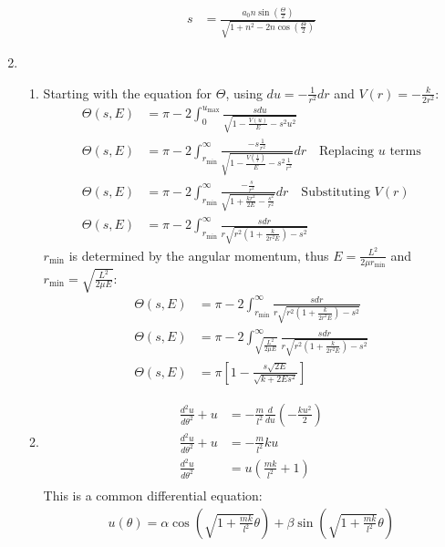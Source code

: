 \documentclass[12pt]{article}
\newcommand{\der}[2]{\frac{d #1}{d #2}}
\begin{document}
\begin{enumerate}
\begin{enumerate}
\begin{align*}
        s&=\frac{a_0 n\sin\left( \frac{\Theta}{2} \right)}{\sqrt{1+n^2-2n\cos\left( \frac{\Theta}{2} \right)}}
      \end{align*}
    \end{enumerate}
    \item
    \begin{enumerate}
      \item Starting with the equation for $\Theta$, using $du=-\frac{1}{r^2}dr$ and $V(r)=-\frac{k}{2r^2}$:
      \begin{align*}
        \Theta(s,E)&=\pi-2\int_0^{u_{\max}}\frac{sdu}{\sqrt{1-\frac{V(u)}{E}-s^2 u^2}}\\
        \Theta(s,E)&=\pi-2\int_{r_{\min}}^{\infty}\frac{-s\frac{1}{r^2}}{\sqrt{1-\frac{V(\frac{1}{r})}{E}-s^2\frac{1}{r^2}}}dr\quad\text{Replacing $u$ terms}\\
        \Theta(s,E)&=\pi-2\int_{r_{\min}}^{\infty}\frac{-\frac{s}{r^2}}{\sqrt{1+\frac{kr^2}{2E}-\frac{s^2}{r^2}}}dr\quad\text{Substituting $V(r)$}\\
        \Theta(s,E)&=\pi-2\int_{r_{\min}}^{\infty}\frac{sdr}{r\sqrt{r^2\left(1+\frac{k}{2r^2 E}\right)-s^2}}
      \end{align*}
      $r_{\min}$ is determined by the angular momentum, thus $E=\frac{L^2}{2\mu r_{\min}}$ and $r_{\min}=\sqrt{\frac{L^2}{2\mu E}}$:
      \begin{align*}
        \Theta(s,E)&=\pi-2\int_{r_{\min}}^{\infty}\frac{sdr}{r\sqrt{r^2\left(1+\frac{k}{2r^2 E}\right)-s^2}}\\
        \Theta(s,E)&=\pi-2\int_{\sqrt{\frac{L^2}{2\mu E}}}^{\infty}\frac{sdr}{r\sqrt{r^2\left(1+\frac{k}{2r^2 E}\right)-s^2}}\\
        \Theta(s,E)&=\pi\left[1-\frac{s\sqrt{2E}}{\sqrt{k+2Es^2}}\right]
      \end{align*}
      \item
      \begin{align*}
        \der{^2u}{\theta^2}+u&=-\frac{m}{l^2}\der{}{u}\left(-\frac{ku^2}{2}\right)\\
        \der{^2u}{\theta^2}+u&=-\frac{m}{l^2}ku\\
        \der{^2u}{\theta^2}&=u\left(\frac{mk}{l^2}+1\right)\\
      \end{align*}
      This is a common differential equation:
      \begin{gather*}
        u(\theta)=\alpha\cos\left(\sqrt{1+\frac{mk}{l^2}}\theta  \right)+\beta\sin\left(\sqrt{1+\frac{mk}{l^2}}\theta  \right)\\

\end{gather*}
\end{enumerate}
\end{enumerate}
\end{document}
